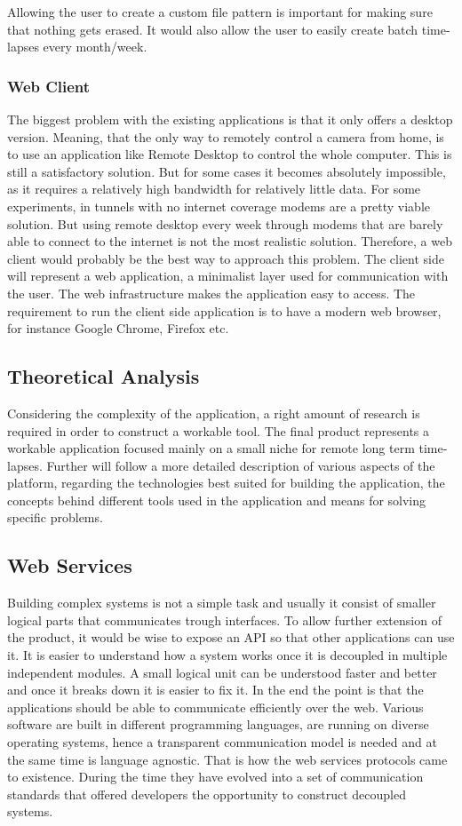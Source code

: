 Allowing the user to create a custom file pattern is important for making sure that nothing gets erased. It would also allow the user to easily create batch time-lapses every month/week.

\subsubsection{Web Client}
The biggest problem with the existing applications is that it only offers a desktop version. Meaning, that the only way to remotely control a camera from home, is to use an application like Remote Desktop to control the whole computer. This is still a satisfactory solution. But for some cases it becomes absolutely impossible, as it requires a relatively high bandwidth for relatively little data. For some experiments, in tunnels with no internet coverage modems are a pretty viable solution. But using remote desktop every week through modems that are barely able to connect to the internet is not the most realistic solution. Therefore, a web client would probably be the best way to approach this problem. The client side will represent a web application, a minimalist layer used for communication with the user. The web infrastructure makes the application easy to access. The requirement to run the client side application is to have a modern web browser, for instance Google Chrome, Firefox etc.

\subsection{Theoretical Analysis}
Considering the complexity of the application, a right amount of research is required in order to construct a workable tool. The final product represents a workable application focused mainly on a small niche for remote long term time-lapses. Further will follow a more detailed description of various aspects of the platform, regarding the technologies best suited for building the application, the concepts behind different tools used in the application and means for solving specific problems.

\subsection{Web Services}
Building complex systems is not a simple task and usually it consist of smaller logical parts that communicates trough interfaces. To allow further extension of the product, it would be wise to expose an API so that other applications can use it. It is easier to understand how a system works once it is decoupled in multiple independent modules. A small logical unit can be understood faster and better and once it breaks down it is easier to fix it. In the end the point is that the applications should be able to communicate efficiently over the web. Various software are built in different programming languages, are running on diverse operating systems, hence a transparent communication model is needed and at the same time is language agnostic. That is how the web services protocols came to existence. During the time they have evolved into a set of communication standards that offered developers the opportunity to construct decoupled systems.

